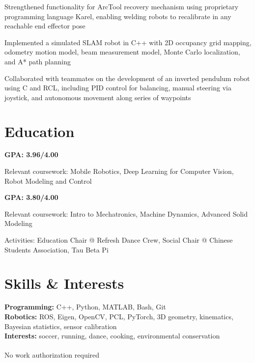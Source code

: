 \documentclass{resume}
\begin{document}
\begin{details}
    \item Strengthened functionality for ArcTool recovery mechanism using proprietary programming language Karel, enabling welding robots to recalibrate in any reachable end effector pose
\end{details}

\begin{details}
    \item Implemented a simulated SLAM robot in C++ with 2D occupancy grid mapping, odometry motion model, beam measurement model, Monte Carlo localization, and A* path planning
    \item Collaborated with teammates on the development of an inverted pendulum robot using C and RCL, including PID control for balancing, manual steering via joystick, and autonomous movement along series of waypoints
\end{details}

\section{Education}

\begin{details}
    \item \textbf{GPA: 3.96/4.00}
    \item Relevant coursework: Mobile Robotics, Deep Learning for Computer Vision, Robot Modeling and Control
\end{details}

\begin{details}
    \item \textbf{GPA: 3.80/4.00}
    \item Relevant coursework: Intro to Mechatronics, Machine Dynamics, Advanced Solid Modeling
    \item Activities: Education Chair @ Refresh Dance Crew, Social Chair @ Chinese Students Association, Tau Beta Pi
\end{details}

\section{Skills \& Interests}
\textbf{Programming:} C++, Python, MATLAB, Bash, Git \\
\textbf{Robotics:} ROS, Eigen, OpenCV, PCL, PyTorch, 3D geometry, kinematics, Bayesian statistics, sensor calibration \\
\textbf{Interests:} soccer, running, dance, cooking, environmental conservation \\~\\
\textsuperscript{\textasteriskcentered}No work authorization required
\end{document}
